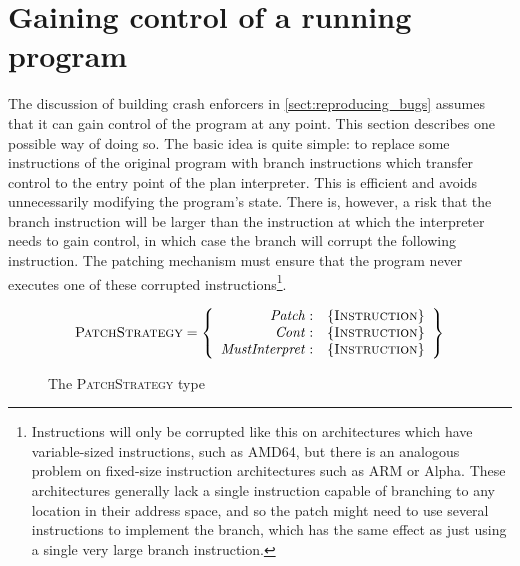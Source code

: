 \chapter{Gaining control of a running program}
\label{sect:enforce:gain_control}


The discussion of building crash enforcers in
\autoref{sect:reproducing_bugs} assumes that it can gain control of
the program at any point.  This section describes one possible way of
doing so.  The basic idea is quite simple: to replace some
instructions of the original program with branch instructions which
transfer control to the entry point of the plan interpreter.  This is
efficient and avoids unnecessarily modifying the program's state.
There is, however, a risk that the branch instruction will be larger
than the instruction at which the interpreter needs to gain control,
in which case the branch will corrupt the following instruction.  The
patching mechanism must ensure that the program never executes one of
these corrupted instructions\footnote{Instructions will only be
  corrupted like this on architectures which have variable-sized
  instructions, such as AMD64, but there is an analogous problem on
  fixed-size instruction architectures such as ARM or Alpha.  These
  architectures generally lack a single instruction capable of
  branching to any location in their address space, and so the patch
  might need to use several instructions to implement the branch,
  which has the same effect as just using a single very large branch
  instruction.}.

\begin{figure}[tp]
  \begin{displaymath}
    \textsc{PatchStrategy} = \left\{\begin{array}{rl}
    \mathit{Patch}: & \{\textsc{Instruction}\} \\
    \mathit{Cont}: & \{\textsc{Instruction}\} \\
    \mathit{MustInterpret}: & \{\textsc{Instruction}\}
    \end{array}\right\}
  \end{displaymath}
  \vspace{-12pt}
  \caption{The \textsc{PatchStrategy} type}
  \label{fig:patch_strategy_type}
\end{figure}

